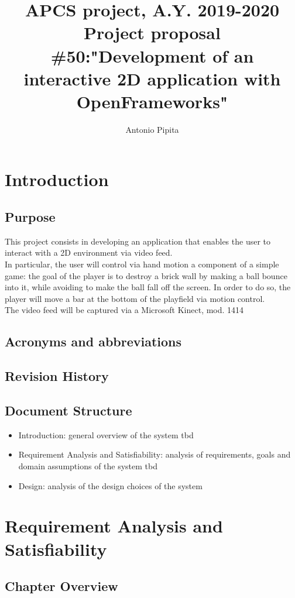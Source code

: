 \documentclass[]{article}
\title{APCS project, A.Y. 2019-2020\\Project proposal \#50:"Development of an interactive 2D application with  OpenFrameworks"}
\author{Antonio Pipita}
\begin{document}
\maketitle
\newpage
\tableofcontents
\newpage
\section{Introduction}
\subsection{Purpose}
This project consists in developing an application that enables the user to interact with a 2D environment via video feed.\\
In particular, the user will control via hand motion a component of a simple game: the goal of the player is to destroy a brick wall by making a ball bounce into it, while avoiding to make the ball fall off the screen. In order to do so, the player will move a bar at the bottom of the playfield via motion control.\\
The video feed will be captured via a Microsoft Kinect, mod. 1414\\
\subsection{Acronyms and abbreviations}
\subsection{Revision History}
\subsection{Document Structure}
\begin{itemize}
	\item Introduction: general overview of the system tbd
	\item Requirement Analysis and Satisfiability: analysis of requirements, goals and domain assumptions of the system tbd
	\item Design: analysis of the design choices of the system
\end{itemize}
\newpage
\section {Requirement Analysis and Satisfiability}
\subsection{Chapter Overview}
\end{document}
